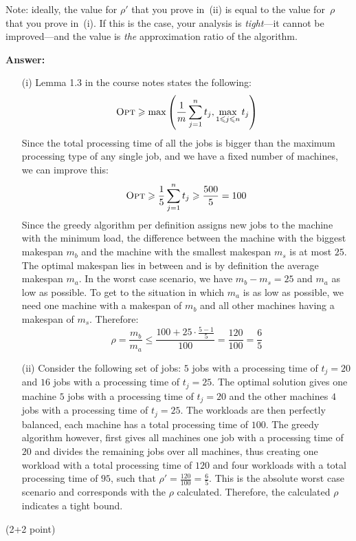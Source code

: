 \documentclass{article}
\renewcommand{\leq}{\leqslant}
\renewcommand{\geq}{\geqslant}
\newcounter{rcounter}
\newenvironment{rlist}%
{\begin{list}{\setnr-\arabic{rcounter}}{\usecounter{rcounter}}}{\end{list}}
\begin{document}
\begin{rlist}
        Note: ideally, the value for $\rho'$ that you prove in~(ii) is equal to the value for~$\rho$ that you prove in~(i). If this is the case, your analysis is \emph{tight}---it cannot be improved---and the value is \emph{the} approximation ratio of the algorithm.
        
        \textbf{Answer:}
        \begin{enumerate}
            \item[(i)]
            Lemma 1.3 in the course notes states the following:
            $$\mbox{\sc Opt} \geq \max \left(\frac{1}{m}\sum_{j=1}^n t_j, \max_{1 \leq j \leq n} t_j\right)$$
            Since the total processing time of all the jobs is bigger than the maximum processing type of any single job, and we have a fixed number of machines, we can improve this:
            $$\mbox{\sc Opt} \geq \frac{1}{5}\sum_{j=1}^n t_j \geq \frac{500}{5} = 100$$
            Since the greedy algorithm per definition assigns new jobs to the machine with the minimum load, the difference between the machine with the biggest makespan $m_b$ and the machine with the smallest makespan $m_s$ is at most $25$. The optimal makespan lies in between and is by definition the average makespan $m_a$. In the worst case scenario, we have $m_b - m_s = 25$ and $m_a$ as low as possible. To get to the situation in which $m_a$ is as low as possible, we need one machine with a makespan of $m_b$ and all other machines having a makespan of $m_s$. Therefore:
            $$\rho = \frac{m_b}{m_a} \leq \frac{100 + 25 \cdot \frac{5-1}{5}}{100} = \frac{120}{100} = \frac{6}{5}$$
            \item[(ii)]
            Consider the following set of jobs: $5$ jobs with a processing time of $t_j = 20$ and $16$ jobs with a processing time of $t_j = 25$. The optimal solution gives one machine $5$ jobs with a processing time of $t_j = 20$ and the other machines $4$ jobs with a processing time of $t_j = 25$. The workloads are then perfectly balanced, each machine has a total processing time of $100$. The greedy algorithm however, first gives all machines one job with a processing time of $20$ and divides the remaining jobs over all machines, thus creating one workload with a total processing time of $120$ and four workloads with a total processing time of $95$, such that $\rho'=\frac{120}{100}=\frac{6}{5}$. This is the absolute worst case scenario and corresponds with the $\rho$ calculated. Therefore, the calculated $\rho$ indicates a tight bound.
        \end{enumerate}
        \item (2+2 point)

\end{rlist}
\end{document}
